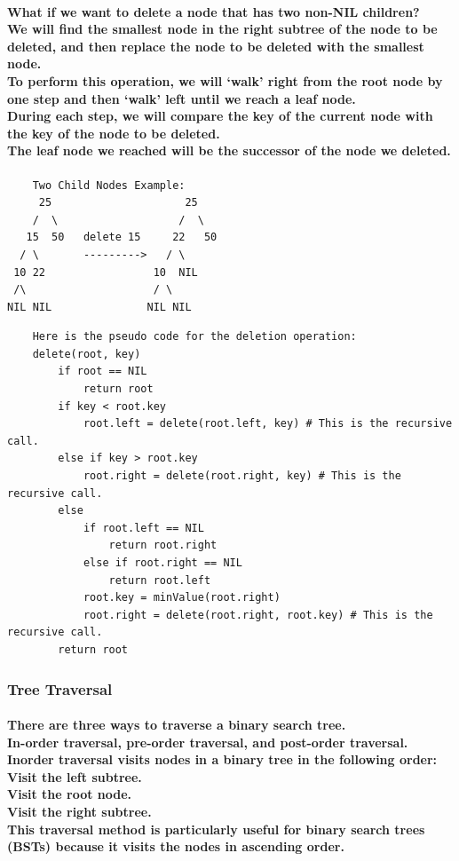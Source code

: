 \documentclass{article}
\begin{document}
\paragraph{
    What if we want to delete a node that has two non-NIL children?\\
    We will find the smallest node in the right subtree of the node to be deleted, and then replace the node to be deleted with the smallest node.\\
    To perform this operation, we will `walk' right from the root node by one step and then `walk' left until we reach a leaf node.\\
    During each step, we will compare the key of the current node with the key of the node to be deleted.\\
    The leaf node we reached will be the successor of the node we deleted.\\
}

\begin{verbatim}
    Two Child Nodes Example:
     25                     25
    /  \                   /  \
   15  50   delete 15     22   50
  / \       --------->   / \
 10 22                 10  NIL
 /\                    / \
NIL NIL               NIL NIL
\end{verbatim}

\begin{verbatim}
    Here is the pseudo code for the deletion operation:
    delete(root, key)
        if root == NIL
            return root
        if key < root.key
            root.left = delete(root.left, key) # This is the recursive call.
        else if key > root.key
            root.right = delete(root.right, key) # This is the recursive call.
        else
            if root.left == NIL
                return root.right
            else if root.right == NIL
                return root.left
            root.key = minValue(root.right)
            root.right = delete(root.right, root.key) # This is the recursive call.
        return root
\end{verbatim}


\subsubsection{Tree Traversal}

\paragraph{
    There are three ways to traverse a binary search tree.\\
    In-order traversal, pre-order traversal, and post-order traversal.\\
    Inorder traversal visits nodes in a binary tree in the following order:\\
    Visit the left subtree.\\
    Visit the root node.\\
    Visit the right subtree.\\
    This traversal method is particularly useful for binary search trees (BSTs) because it visits the nodes in ascending order.\\
}
\end{document}
